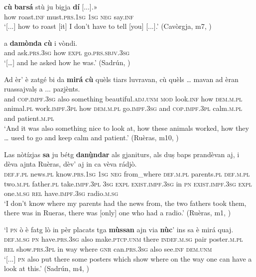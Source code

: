\ea
\label{ex:indinterr9}
\gll [...] \textbf{cù} \textbf{barsá} stù ju bigja \textbf{dí} [...].»\\
{} how roast.\textsc{inf} must.\textsc{prs.1sg} \textsc{1sg} \textsc{neg} say.\textsc{inf}\\
\glt `[...] how to roast [it] I don't have to tell [you] [...].' (Cavòrgja, m7, )
\z

\ea
\label{ex:indinterr1}
\gll    [...] a \textbf{damònda} \textbf{cù} i vòndi.\\
{} and ask.\textsc{prs.3sg} how \textsc{expl} go.\textsc{prs.sbjv.3sg}\\
\glt `[…] and he asked how he was.' (Sadrún, \citealt[105]{Büchli1966})
\z

\ea
\label{ex:indinterr2}
\gll   Ad èr' è zatgé bi da \textbf{mirá} \textbf{cù} quèls tiars luvravan, cù quèls … mavan ad èran ruassajvalṣ a ... pazjènts.\\
and \textsc{cop.impf.3sg} also something beautiful.\textsc{adj.unm} \textsc{mod} look.\textsc{inf} how \textsc{dem.m.pl} animal.\textsc{pl} work.\textsc{impf.3pl} how \textsc{dem.m.pl} {} go.\textsc{impf.3sg} and \textsc{cop.impf.3pl} calm.\textsc{m.pl} {} and patient.\textsc{m.pl}  \\
\glt `And it was also something nice to look at, how these animals worked, how they … used to go and keep calm and patient.' (Ruèras, m10, )
\z

\ea
\label{ex:indinterr3}
\gll    Las nòtízjas \textbf{sa} ju bétg \textbf{danù̱ndar} als gjaniturs, als duṣ baps prandèvan aj, i dèva ajnta Ruèras, dèv’ aj in ca vèva rádjò. \\
\textsc{def.f.pl} news.\textsc{pl} know.\textsc{prs.1sg} \textsc{1sg} \textsc{neg} from\_where \textsc{def.m.pl} parents.\textsc{pl} \textsc{def.m.pl} two.\textsc{m.pl} father.\textsc{pl} take.\textsc{impf.3pl} \textsc{3sg} \textsc{expl} \textsc{exist.impf.3sg} in \textsc{pn} \textsc{exist.impf.3sg} \textsc{expl}  one.\textsc{m.sg} \textsc{rel} have.\textsc{impf.3sg} radio.\textsc{m.sg}\\
\glt `I don’t know where my parents had the news from, the two fathers took them, there was in Rueras, there was [only] one who had a radio.' (Ruèras, m1, )
\z

\ea
\label{ex:indinterr4}
\gll [...] `l \textsc{pn} ò è fatg lò in pèr placats tga \textbf{mùssan} ajn via \textbf{nùc}’ ins sa è mirá quaj.\\
{} \textsc{def.m.sg} \textsc{pn} have.\textsc{prs.3sg} also make.\textsc{ptcp.unm} there \textsc{indef.m.sg} pair poster.\textsc{m.pl} \textsc{rel} show.\textsc{prs.3pl} in way where \textsc{gnr} can.\textsc{prs.3sg} also see.\textsc{inf} \textsc{dem.unm} \\
\glt `[...] \textsc{pn} also put there some posters which show where on the way one can have a look at this.' (Sadrún, m4, )
\z

